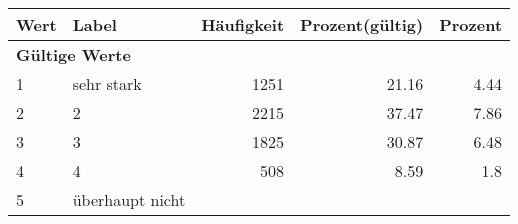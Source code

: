     \begin{longtable}{lXrrr}
     \toprule
     \textbf{Wert} & \textbf{Label} & \textbf{Häufigkeit} & \textbf{Prozent(gültig)} & \textbf{Prozent} \\
     \endhead
     \midrule
     \multicolumn{5}{l}{\textbf{Gültige Werte}}\\

     1 &
     \multicolumn{1}{X}{ sehr stark   } &


       \num{1251} &
       \num[round-mode=places,round-precision=2]{21,16} &
         \num[round-mode=places,round-precision=2]{4,44} \\

     2 &
     \multicolumn{1}{X}{ 2   } &


       \num{2215} &
       \num[round-mode=places,round-precision=2]{37,47} &
         \num[round-mode=places,round-precision=2]{7,86} \\

     3 &
     \multicolumn{1}{X}{ 3   } &


       \num{1825} &
       \num[round-mode=places,round-precision=2]{30,87} &
         \num[round-mode=places,round-precision=2]{6,48} \\

     4 &
     \multicolumn{1}{X}{ 4   } &


       \num{508} &
       \num[round-mode=places,round-precision=2]{8,59} &
         \num[round-mode=places,round-precision=2]{1,8} \\

     5 &
     \multicolumn{1}{X}{ überhaupt nicht   } &



\end{longtable}
